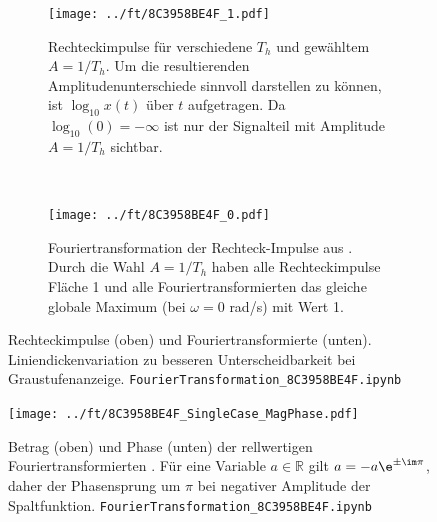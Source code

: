 \begin{figure}[h!]
\centering
\begin{subfigure}{1\textwidth}
\centering
\texttt{[image: ../ft/8C3958BE4F\_1.pdf]}
\caption{Rechteckimpulse für verschiedene $T_h$ und gewähltem $A=1/T_h$.
Um die resultierenden Amplitudenunterschiede sinnvoll darstellen zu können,
ist $\log_{10}x(t)$ über $t$ aufgetragen. Da $\log_{10}(0)=-\infty$
ist nur der Signalteil mit Amplitude $A=1/T_h$ sichtbar.}
\label{fig:8C3958BE4F_1}
\end{subfigure}
\\
\begin{subfigure}{1\textwidth}
\centering
\texttt{[image: ../ft/8C3958BE4F\_0.pdf]}
\caption{Fouriertransformation der Rechteck-Impulse aus
. Durch die Wahl $A=1/T_h$ haben alle Rechteckimpulse Fläche
1 und alle Fouriertransformierten
das gleiche globale Maximum (bei $\omega=0$ rad/s) mit Wert 1.}
\label{fig:8C3958BE4F_0}
\end{subfigure}
%
\caption{Rechteckimpulse (oben) und Fouriertransformierte (unten).
Liniendickenvariation zu besseren Unterscheidbarkeit bei Graustufenanzeige.
\texttt{FourierTransformation\_8C3958BE4F.ipynb}}
\label{fig:8C3958BE4F}
\end{figure}


\begin{figure}[h!]
\texttt{[image: ../ft/8C3958BE4F\_SingleCase\_MagPhase.pdf]}
  \caption{Betrag (oben) und Phase (unten) der rellwertigen
  Fouriertransformierten . Für eine Variable
  $a\in\mathbb{R}$ gilt $a = -a \e^{\pm\im\pi}$, daher
  der Phasensprung um $\pi$ bei negativer Amplitude der Spaltfunktion.
\texttt{FourierTransformation\_8C3958BE4F.ipynb}}
  \label{fig:8C3958BE4F_SingleCase_MagPhase}
\end{figure}




\clearpage
